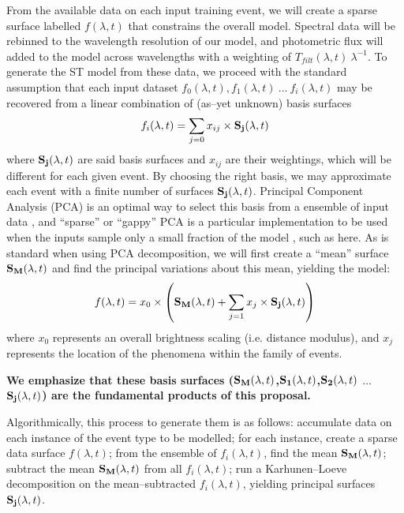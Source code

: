 From the available data on each input training event, we will create a sparse
surface labelled $f(\lambda, t)$ that constrains the overall model.  Spectral
data will be rebinned to the wavelength resolution of our model, and photometric
flux will added to the model across wavelengths with a weighting of
$T_{filt}(\lambda, t)~\lambda^{-1}$.  To generate the ST model from these data,
we proceed with the standard assumption that each input dataset $f_0(\lambda,
t), f_1(\lambda, t)~\ldots~f_i(\lambda, t)$ may be recovered from a linear
combination of (as--yet unknown) basis surfaces $$f_i(\lambda, t) = \sum_{j=0}
x_{ij} \times {\bf S_j}(\lambda, t)$$ where ${\bf S_j}(\lambda, t)$ are said
basis surfaces and $x_{ij}$ are their weightings, which will be different for
each given event.  By choosing the right basis, we may approximate each event
with a finite number of surfaces ${\bf S_j}(\lambda, t)$. Principal Component
Analysis (PCA) is an optimal way to select this basis from a ensemble of input
data \cite[e.g.][for astrophysical application to galaxy
spectra]{1995AJ....110.1071C}, and ``sparse'' or ``gappy'' PCA is a particular
implementation to be used when the inputs sample only a small fraction of the
model \citep[e.g.][]{zouht04}, such as here.  As is standard when using PCA
decomposition, we will first create a ``mean'' surface ${\bf S_M}(\lambda, t)$
and find the principal variations about this mean, yielding the model:
$$f(\lambda, t) = x_0 \times \left( {\bf S_M}(\lambda, t) + \sum_{j=1} x_j
\times {\bf S_j}(\lambda, t) \right)$$ where $x_0$ represents an overall
brightness scaling (i.e. distance modulus), and $x_j$ represents the location of
the phenomena within the family of events.

\begin{center} {\bf We emphasize that these basis surfaces (${\bf S_M}(\lambda,
t)$,${\bf S_1}(\lambda, t)$,${\bf S_2}(\lambda, t)$ $\ldots$ ${\bf S_j}(\lambda,
t)$) are the fundamental products of this proposal.} \end{center}

Algorithmically, this process to generate them is as follows: accumulate data on
each instance of the event type to be modelled; for each instance, create a
sparse data surface $f(\lambda, t)$; from the ensemble of $f_i(\lambda, t)$,
find the mean ${\bf S_M}(\lambda, t)$; subtract the mean ${\bf S_M}(\lambda, t)$
from all $f_i(\lambda, t)$; run a Karhunen--Loeve decomposition
\citep{Karhunen:47,Loeve:48} on the mean--subtracted $f_i(\lambda, t)$, yielding
principal surfaces ${\bf S_j}(\lambda, t)$.

